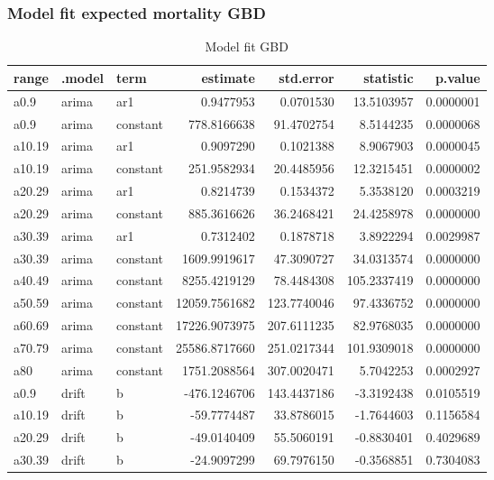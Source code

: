 \documentclass[
]{article}
\begin{document}
\hypertarget{model-fit-expected-mortality-gbd}{%
\subsubsection{Model fit expected mortality GBD}\label{model-fit-expected-mortality-gbd}}

\begin{table}[!h]

\caption{\label{tab:fitg}Model fit GBD}
\centering
\begin{tabular}[t]{lllrrrr}
\toprule
range & .model & term & estimate & std.error & statistic & p.value\\
\midrule
a0.9 & arima & ar1 & 0.9477953 & 0.0701530 & 13.5103957 & 0.0000001\\
a0.9 & arima & constant & 778.8166638 & 91.4702754 & 8.5144235 & 0.0000068\\
a10.19 & arima & ar1 & 0.9097290 & 0.1021388 & 8.9067903 & 0.0000045\\
a10.19 & arima & constant & 251.9582934 & 20.4485956 & 12.3215451 & 0.0000002\\
a20.29 & arima & ar1 & 0.8214739 & 0.1534372 & 5.3538120 & 0.0003219\\
\addlinespace
a20.29 & arima & constant & 885.3616626 & 36.2468421 & 24.4258978 & 0.0000000\\
a30.39 & arima & ar1 & 0.7312402 & 0.1878718 & 3.8922294 & 0.0029987\\
a30.39 & arima & constant & 1609.9919617 & 47.3090727 & 34.0313574 & 0.0000000\\
a40.49 & arima & constant & 8255.4219129 & 78.4484308 & 105.2337419 & 0.0000000\\
a50.59 & arima & constant & 12059.7561682 & 123.7740046 & 97.4336752 & 0.0000000\\
\addlinespace
a60.69 & arima & constant & 17226.9073975 & 207.6111235 & 82.9768035 & 0.0000000\\
a70.79 & arima & constant & 25586.8717660 & 251.0217344 & 101.9309018 & 0.0000000\\
a80 & arima & constant & 1751.2088564 & 307.0020471 & 5.7042253 & 0.0002927\\
a0.9 & drift & b & -476.1246706 & 143.4437186 & -3.3192438 & 0.0105519\\
a10.19 & drift & b & -59.7774487 & 33.8786015 & -1.7644603 & 0.1156584\\
\addlinespace
a20.29 & drift & b & -49.0140409 & 55.5060191 & -0.8830401 & 0.4029689\\
a30.39 & drift & b & -24.9097299 & 69.7976150 & -0.3568851 & 0.7304083\\

\end{tabular}
\end{table}
\end{document}
